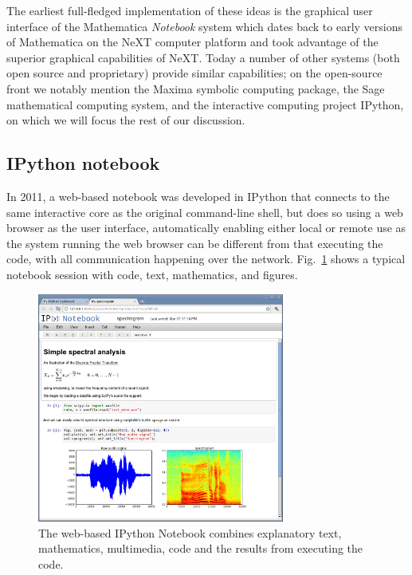 \documentclass[ChapterTOCs,krantz2]{krantz} %
\begin{document}
The earliest full-fledged implementation of these ideas is the graphical user
interface of the Mathematica \emph{Notebook} system which dates back to early
versions of Mathematica on the NeXT computer platform and took advantage of the
superior graphical capabilities of NeXT.  Today a number of other systems (both
open source and proprietary) provide similar capabilities; on the open-source
front we notably mention the Maxima \cite{maxima} symbolic computing
package, the Sage \cite{sage} mathematical computing system, and the
interactive computing project IPython, on which we will focus the rest of our
discussion.

\subsection{IPython notebook}\label{subsec:IPython}

In 2011, a web-based notebook was developed in IPython that connects to the
same interactive core as the original command-line shell, but does so using a
web browser as the user interface, automatically enabling either local or
remote use as the system running the web browser can be different from that
executing the code, with all communication happening over the network.
Fig.~\ref{fig:IPython-notebook} shows a typical notebook session with code,
text, mathematics, and figures.

\begin{figure}
  \begin{centering}
    \includegraphics[width=3.2in]{fig/ipython-notebook-specgram.png}\par
  \end{centering}

  \caption{\label{fig:IPython-notebook}The web-based IPython Notebook combines
    explanatory text, mathematics, multimedia, code and the results from
    executing the code.}
\end{figure}
\end{document}
